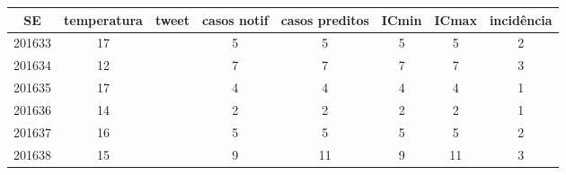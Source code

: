 \begin{tabular}{c|ccccccc}
  \hline
SE & temperatura & tweet & casos notif & casos preditos & ICmin & ICmax & incidência \\ 
  \hline
201633 & 17 &  & 5 & 5 & 5 & 5 & 2 \\ 
  201634 & 12 &  & 7 & 7 & 7 & 7 & 3 \\ 
  201635 & 17 &  & 4 & 4 & 4 & 4 & 1 \\ 
  201636 & 14 &  & 2 & 2 & 2 & 2 & 1 \\ 
  201637 & 16 &  & 5 & 5 & 5 & 5 & 2 \\ 
  201638 & 15 &  & 9 & 11 & 9 & 11 & 3 \\ 
   \hline
\end{tabular}

